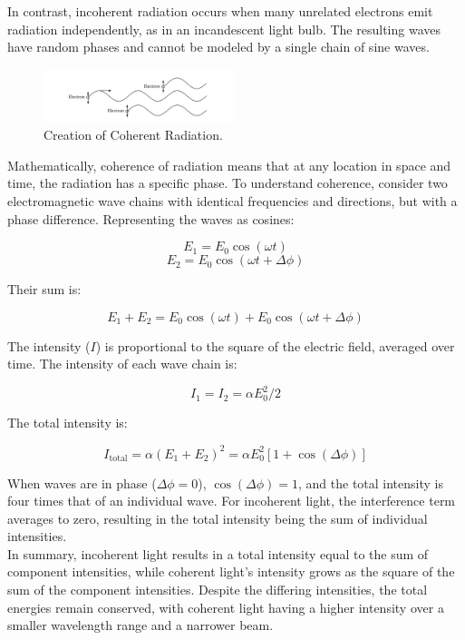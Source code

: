In contrast, incoherent radiation occurs when many unrelated electrons emit radiation independently, as in an incandescent light bulb. The resulting waves have random phases and cannot be modeled by a single chain of sine waves.

\begin{figure}[H]
	\centering
	\includegraphics[width=0.5\textwidth]{Images/coherent_radiation.png}
	\caption{Creation of Coherent Radiation.}
	\label{fig:coherent_radiation}
\end{figure}

Mathematically, coherence of radiation means that at any location in space and time, the radiation has a specific phase. To understand coherence, consider two electromagnetic wave chains with identical frequencies and directions, but with a phase difference. Representing the waves as cosines:

\[
E_1 = E_0 \cos(\omega t)
\]
\[
E_2 = E_0 \cos(\omega t + \Delta \phi)
\]

Their sum is:

\[
E_1 + E_2 = E_0 \cos(\omega t) + E_0 \cos(\omega t + \Delta \phi)
\]

The intensity (\( I \)) is proportional to the square of the electric field, averaged over time. The intensity of each wave chain is:

\[
I_1 = I_2 = \alpha E_0^2 / 2
\]

The total intensity is:

\[
I_{\text{total}} = \alpha (E_1 + E_2)^2 = \alpha E_0^2 \left[1 + \cos(\Delta \phi)\right]
\]

When waves are in phase (\( \Delta \phi = 0 \)), \( \cos(\Delta \phi) = 1 \), and the total intensity is four times that of an individual wave. For incoherent light, the interference term averages to zero, resulting in the total intensity being the sum of individual intensities. \\

In summary, incoherent light results in a total intensity equal to the sum of component intensities, while coherent light's intensity grows as the square of the sum of the component intensities. Despite the differing intensities, the total energies remain conserved, with coherent light having a higher intensity over a smaller wavelength range and a narrower beam.


